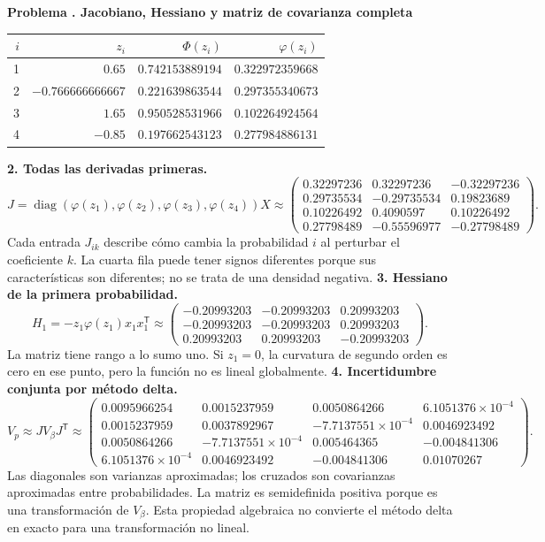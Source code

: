 \documentclass[11pt,a4paper]{article}
\newcommand{\T}{^{\mathsf T}}
\DeclareMathOperator{\diag}{diag}
\theoremstyle{definition}
\newcounter{problema}
\newenvironment{resuelto}[1]{\refstepcounter{problema}\par\medskip\Needspace{6\baselineskip}\textbf{Problema \theproblema. #1}\par}{\par\medskip}
\begin{document}
\begin{resuelto}{Jacobiano, Hessiano y matriz de covarianza completa}
\begin{center}\small\begin{tabular}{rrrr}
\toprule
$i$&$z_i$&$\Phi(z_i)$&$\varphi(z_i)$\\
\midrule
1&$0.65$&$0.742153889194$&$0.322972359668$\\
2&$-0.766666666667$&$0.221639863544$&$0.297355340673$\\
3&$1.65$&$0.950528531966$&$0.102264924564$\\
4&$-0.85$&$0.197662543123$&$0.277984886131$\\
\bottomrule\end{tabular}\end{center}
\textbf{2. Todas las derivadas primeras.}
\[
J=\diag(\varphi(z_1),\varphi(z_2),\varphi(z_3),\varphi(z_4))X\approx\begin{pmatrix}0.32297236&0.32297236&-0.32297236\\0.29735534&-0.29735534&0.19823689\\0.10226492&0.4090597&0.10226492\\0.27798489&-0.55596977&-0.27798489\end{pmatrix}.
\]
Cada entrada $J_{ik}$ describe cómo cambia la probabilidad $i$ al perturbar el coeficiente $k$. La cuarta fila puede tener signos diferentes porque sus características son diferentes; no se trata de una densidad negativa.
\textbf{3. Hessiano de la primera probabilidad.}
\[
H_1=-z_1\varphi(z_1)x_1x_1\T\approx\begin{pmatrix}-0.20993203&-0.20993203&0.20993203\\-0.20993203&-0.20993203&0.20993203\\0.20993203&0.20993203&-0.20993203\end{pmatrix}.
\]
La matriz tiene rango a lo sumo uno. Si $z_1=0$, la curvatura de segundo orden es cero en ese punto, pero la función no es lineal globalmente.
\textbf{4. Incertidumbre conjunta por método delta.}
\[
V_p\approx JV_\beta J\T\approx\begin{pmatrix}0.0095966254&0.0015237959&0.0050864266&6.1051376\times10^{-4}\\0.0015237959&0.0037892967&-7.7137551\times10^{-4}&0.0046923492\\0.0050864266&-7.7137551\times10^{-4}&0.005464365&-0.004841306\\6.1051376\times10^{-4}&0.0046923492&-0.004841306&0.01070267\end{pmatrix}.
\]
Las diagonales son varianzas aproximadas; los cruzados son covarianzas aproximadas entre probabilidades. La matriz es semidefinida positiva porque es una transformación de $V_\beta$. Esta propiedad algebraica no convierte el método delta en exacto para una transformación no lineal.

\end{resuelto}
\end{document}
